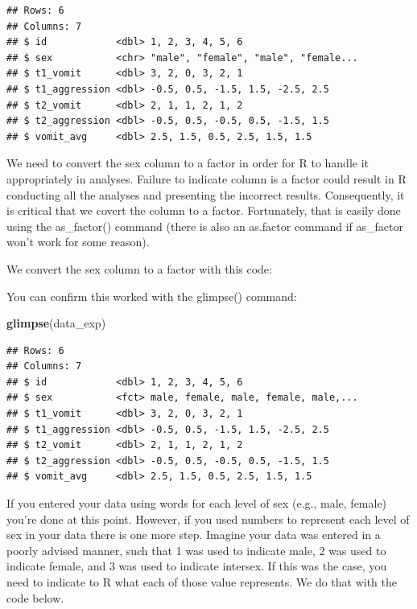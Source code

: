 \documentclass[
]{krantz}
\makeatletter
\newenvironment{Shaded}{\begin{snugshade}}{\end{snugshade}}
\newcommand{\DataTypeTok}[1]{\textcolor[rgb]{0.27,0.27,0.27}{#1}}
\newcommand{\KeywordTok}[1]{\textcolor[rgb]{0.27,0.27,0.27}{\textbf{#1}}}
\newcommand{\NormalTok}[1]{#1}
\newcommand{\OperatorTok}[1]{\textcolor[rgb]{0.43,0.43,0.43}{\textbf{#1}}}
\newcommand{\StringTok}[1]{\textcolor[rgb]{0.5,0.5,0.5}{#1}}
\newenvironment{kframe}{%
\medskip{}
\setlength{\fboxsep}{.8em}
 \def\at@end@of@kframe{}%
 \ifinner\ifhmode%
  \def\at@end@of@kframe{\end{minipage}}%
  \begin{minipage}{\columnwidth}%
 \fi\fi%
 \def\FrameCommand##1{\hskip\@totalleftmargin \hskip-\fboxsep
 \colorbox{shadecolor}{##1}\hskip-\fboxsep
     \hskip-\linewidth \hskip-\@totalleftmargin \hskip\columnwidth}%
 \MakeFramed {\advance\hsize-\width
   \@totalleftmargin\z@ \linewidth\hsize
   \@setminipage}}%
 {\par\unskip\endMakeFramed%
 \at@end@of@kframe}
\renewenvironment{Shaded}{\begin{kframe}}{\end{kframe}}
\makeatother
\begin{document}
\begin{verbatim}
## Rows: 6
## Columns: 7
## $ id            <dbl> 1, 2, 3, 4, 5, 6
## $ sex           <chr> "male", "female", "male", "female...
## $ t1_vomit      <dbl> 3, 2, 0, 3, 2, 1
## $ t1_aggression <dbl> -0.5, 0.5, -1.5, 1.5, -2.5, 2.5
## $ t2_vomit      <dbl> 2, 1, 1, 2, 1, 2
## $ t2_aggression <dbl> -0.5, 0.5, -0.5, 0.5, -1.5, 1.5
## $ vomit_avg     <dbl> 2.5, 1.5, 0.5, 2.5, 1.5, 1.5
\end{verbatim}

We need to convert the sex column to a factor in order for R to handle it appropriately in analyses. Failure to indicate column is a factor could result in R conducting all the analyses and presenting the incorrect results. Consequently, it is critical that we covert the column to a factor. Fortunately, that is easily done using the as\_factor() command (there is also an as.factor command if as\_factor won't work for some reason).

We convert the sex column to a factor with this code:

\begin{Shaded}
\end{Shaded}

You can confirm this worked with the glimpse() command:

\begin{Shaded}
\begin{Highlighting}[]
\KeywordTok{glimpse}\NormalTok{(data_exp)}
\end{Highlighting}
\end{Shaded}

\begin{verbatim}
## Rows: 6
## Columns: 7
## $ id            <dbl> 1, 2, 3, 4, 5, 6
## $ sex           <fct> male, female, male, female, male,...
## $ t1_vomit      <dbl> 3, 2, 0, 3, 2, 1
## $ t1_aggression <dbl> -0.5, 0.5, -1.5, 1.5, -2.5, 2.5
## $ t2_vomit      <dbl> 2, 1, 1, 2, 1, 2
## $ t2_aggression <dbl> -0.5, 0.5, -0.5, 0.5, -1.5, 1.5
## $ vomit_avg     <dbl> 2.5, 1.5, 0.5, 2.5, 1.5, 1.5
\end{verbatim}

If you entered your data using words for each level of sex (e.g., male, female) you're done at this point. However, if you used numbers to represent each level of sex in your data there is one more step. Imagine your data was entered in a poorly advised manner, such that 1 was used to indicate male, 2 was used to indicate female, and 3 was used to indicate intersex. If this was the case, you need to indicate to R what each of those value represents. We do that with the code below.
\end{document}
